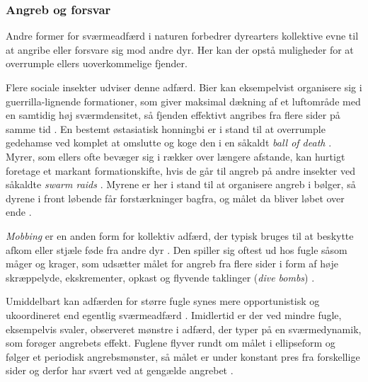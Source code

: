 \subsubsection{Angreb og forsvar}
Andre former for sværmeadfærd i naturen forbedrer dyrearters kollektive evne til at angribe eller forsvare sig mod andre dyr. Her kan der opstå muligheder for at overrumple ellers uoverkommelige fjender.
\par
Flere sociale insekter udviser denne adfærd. Bier kan eksempelvist organisere sig i guerrilla-lignende formationer, som giver maksimal dækning af et luftområde med en samtidig høj sværmdensitet, så fjenden effektivt angribes fra flere sider på samme tid \cite{arquilla2000}. En bestemt østasiatisk honningbi er i stand til at overrumple gedehamse ved komplet at omslutte og koge den i en såkaldt \textit{ball of death} \cite{ugajin2012}. Myrer, som ellers ofte bevæger sig i rækker over længere afstande, kan hurtigt foretage et markant formationskifte, hvis de går til angreb på andre insekter ved såkaldte \textit{swarm raids} \cite{holldobler1994}. Myrene er her i stand til at organisere angreb i bølger, så dyrene i front løbende får forstærkninger bagfra, og målet da bliver løbet over ende \cite{edwards2000}. %
\par
\textit{Mobbing} er en anden form for kollektiv adfærd, der typisk bruges til at beskytte afkom eller stjæle føde fra andre dyr \cite{alcock1998}. Den spiller sig oftest ud hos fugle såsom måger og krager, som udsætter målet for angreb fra flere sider i form af høje skræppelyde, ekskrementer, opkast og flyvende taklinger (\textit{dive bombs}) \cite{altmann1956}. 
\par
Umiddelbart kan adfærden for større fugle synes mere opportunistisk og ukoordineret end egentlig sværmeadfærd \cite{arquilla2000}. Imidlertid er der ved mindre fugle, eksempelvis svaler, observeret mønstre i adfærd, der typer på en sværmedynamik, som forøger angrebets effekt. Fuglene flyver rundt om målet i ellipseform og følger et periodisk angrebsmønster, så målet er under konstant pres fra forskellige sider og derfor har svært ved at gengælde angrebet \cite{bardi2010}. 


